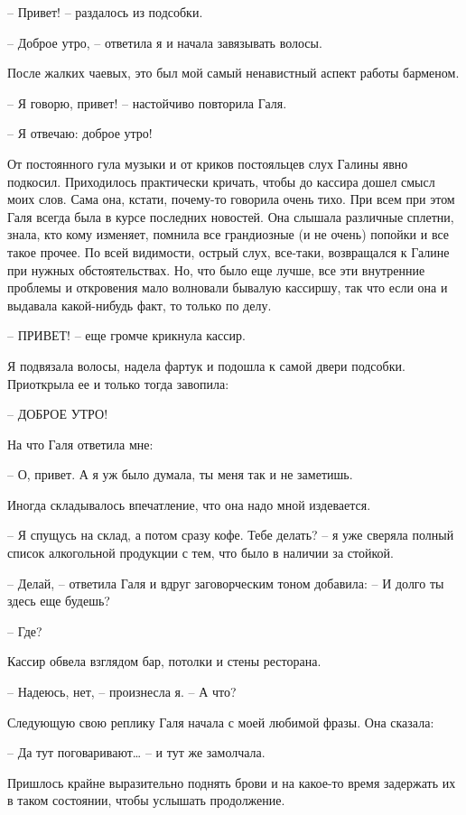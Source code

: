 \documentclass[
]{book}
\begin{document}
-- Привет! -- раздалось из подсобки.

-- Доброе утро, -- ответила я и начала завязывать волосы.

После жалких чаевых, это был мой самый ненавистный аспект работы барменом.

-- Я говорю, привет! -- настойчиво повторила Галя.

-- Я отвечаю: доброе утро!

От постоянного гула музыки и от криков постояльцев слух Галины явно подкосил. Приходилось практически кричать, чтобы до кассира дошел смысл моих слов. Сама она, кстати, почему-то говорила очень тихо. При всем при этом Галя всегда была в курсе последних новостей. Она слышала различные сплетни, знала, кто кому изменяет, помнила все грандиозные (и не очень) попойки и все такое прочее. По всей видимости, острый слух, все-таки, возвращался к Галине при нужных обстоятельствах. Но, что было еще лучше, все эти внутренние проблемы и откровения мало волновали бывалую кассиршу, так что если она и выдавала какой-нибудь факт, то только по делу.

-- ПРИВЕТ! -- еще громче крикнула кассир.

Я подвязала волосы, надела фартук и подошла к самой двери подсобки. Приоткрыла ее и только тогда завопила:

-- ДОБРОЕ УТРО!

На что Галя ответила мне:

-- О, привет. А я уж было думала, ты меня так и не заметишь.

Иногда складывалось впечатление, что она надо мной издевается.

-- Я спущусь на склад, а потом сразу кофе. Тебе делать? -- я уже сверяла полный список алкогольной продукции с тем, что было в наличии за стойкой.

-- Делай, -- ответила Галя и вдруг заговорческим тоном добавила: -- И долго ты здесь еще будешь?

-- Где?

Кассир обвела взглядом бар, потолки и стены ресторана.

-- Надеюсь, нет, -- произнесла я. -- А что?

Следующую свою реплику Галя начала с моей любимой фразы. Она сказала:

-- Да тут поговаривают\ldots{} -- и тут же замолчала.

Пришлось крайне выразительно поднять брови и на какое-то время задержать их в таком состоянии, чтобы услышать продолжение.
\end{document}
